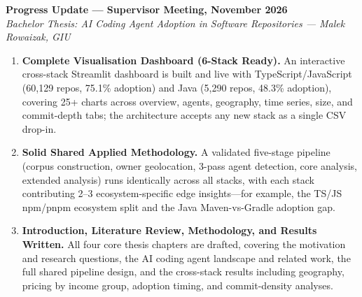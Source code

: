 \documentclass[12pt,a4paper]{article}
\begin{document}
\begin{center}
  {\large\textbf{Progress Update --- Supervisor Meeting, November 2026}}\\[4pt]
  \textit{Bachelor Thesis: AI Coding Agent Adoption in Software Repositories --- Malek Rowaizak, GIU}
\end{center}

\bigskip

\begin{enumerate}[leftmargin=*, label=\textbf{\arabic*.}]

  \item \textbf{Complete Visualisation Dashboard (6-Stack Ready).}
  An interactive cross-stack Streamlit dashboard is built and live with TypeScript/JavaScript (60,129 repos, 75.1\% adoption) and Java (5,290 repos, 48.3\% adoption), covering 25+ charts across overview, agents, geography, time series, size, and commit-depth tabs; the architecture accepts any new stack as a single CSV drop-in.

  \item \textbf{Solid Shared Applied Methodology.}
  A validated five-stage pipeline (corpus construction, owner geolocation, 3-pass agent detection, core analysis, extended analysis) runs identically across all stacks, with each stack contributing 2--3 ecosystem-specific edge insights---for example, the TS/JS npm/pnpm ecosystem split and the Java Maven-vs-Gradle adoption gap.

  \item \textbf{Introduction, Literature Review, Methodology, and Results Written.}
  All four core thesis chapters are drafted, covering the motivation and research questions, the AI coding agent landscape and related work, the full shared pipeline design, and the cross-stack results including geography, pricing by income group, adoption timing, and commit-density analyses.

\end{enumerate}
\end{document}
